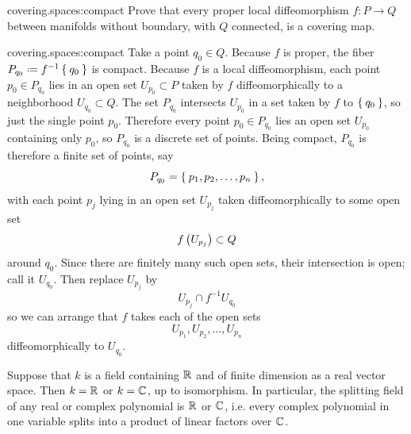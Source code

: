 \begin{problem}{covering.spaces:compact}
Prove that every proper local diffeomorphism \(f \colon P \to Q\) between manifolds without boundary, with \(Q\) connected, is a covering map.
\end{problem}
\begin{answer}{covering.spaces:compact}
Take a point \(q_0\in Q\).
Because \(f\) is proper, the fiber \(P_{q_0} \defeq f^{-1}\Set{q_0}\) is compact.
Because \(f\) is a local diffeomorphism, each point \(p_0 \in P_{q_0}\) lies in an open set \(U_{p_0} \subset P\) taken by \(f\) diffeomorphically to a neighborhood  \(U_{q_0} \subset Q\).
The set \(P_{q_0}\) intersects \(U_{p_0}\) in a set taken by \(f\) to \(\Set{q_0}\), so just the single point \(p_0\).
Therefore every point \(p_0 \in P_{q_0}\) lies an open set \(U_{p_0}\) containing only \(p_0\), so \(P_{q_0}\) is a discrete set of points.
Being compact, \(P_{q_0}\) is therefore a finite set of points, say
\[
P_{q_0} = \Set{p_1, p_2, \dots, p_n},
\]
with each point \(p_j\) lying in an open set \(U_{p_j}\) taken diffeomorphically to some open set 
\[
f\left(U_{p_j}\right) \subset Q
\]
around \(q_0\).
Since there are finitely many such open sets, their intersection is open; call it \(U_{q_0}\).
Then replace \(U_{p_j}\) by
\[
U_{p_j} \cap f^{-1}U_{q_0} 
\]
so we can arrange that \(f\) takes each of the open sets 
\[
U_{p_1}, U_{p_2}, \dots, U_{p_n}
\]
diffeomorphically to \(U_{q_0}\).
\end{answer}
\begin{theorem}
Suppose that \(k\) is a field containing \(\mathbb{R}^{}\) and of finite dimension as a real vector space.
Then \(k=\mathbb{R}^{}\) or \(k=\mathbb{C}^{}\), up to isomorphism.
In particular, the splitting field of any real or complex polynomial is \(\mathbb{R}^{}\) or \(\mathbb{C}^{}\), i.e. every complex polynomial in one variable splits into a product of linear factors over \(\mathbb{C}^{}\).
\end{theorem}
